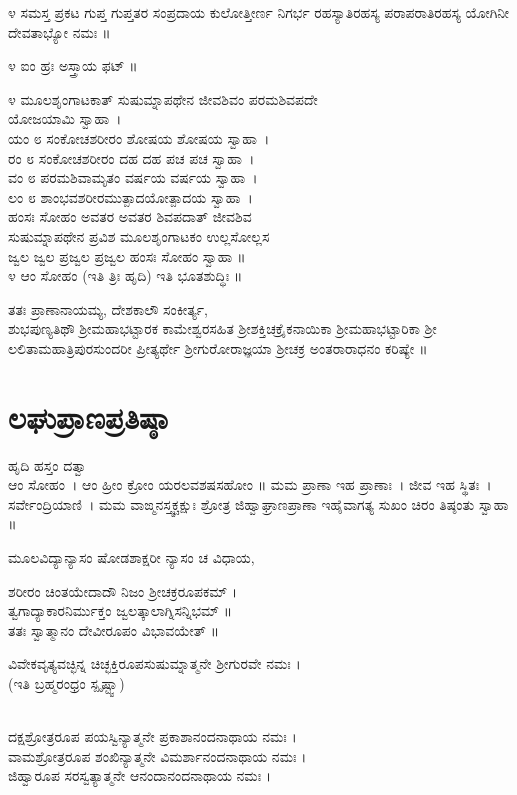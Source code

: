 ೪ ಸಮಸ್ತ ಪ್ರಕಟ ಗುಪ್ತ ಗುಪ್ತತರ ಸಂಪ್ರದಾಯ ಕುಲೋತ್ತೀರ್ಣ ನಿಗರ್ಭ ರಹಸ್ಯಾ\-ತಿರಹಸ್ಯ ಪರಾಪರಾತಿರಹಸ್ಯ ಯೋಗಿನೀ ದೇವತಾಭ್ಯೋ ನಮಃ ॥

೪ ಐಂ ಹ್ರಃ ಅಸ್ತ್ರಾಯ ಫಟ್ ॥

೪ ಮೂಲಶೃಂಗಾಟಕಾತ್ ಸುಷುಮ್ನಾಪಥೇನ ಜೀವಶಿವಂ ಪರಮಶಿವಪದೇ \\ಯೋಜಯಾಮಿ ಸ್ವಾಹಾ~।\\
ಯಂ ೮ ಸಂಕೋಚಶರೀರಂ ಶೋಷಯ ಶೋಷಯ ಸ್ವಾಹಾ~।\\
ರಂ ೮ ಸಂಕೋಚಶರೀರಂ ದಹ ದಹ ಪಚ ಪಚ ಸ್ವಾಹಾ~।\\
ವಂ ೮ ಪರಮಶಿವಾಮೃತಂ ವರ್ಷಯ ವರ್ಷಯ ಸ್ವಾಹಾ~।\\
ಲಂ ೮ ಶಾಂಭವಶರೀರಮುತ್ಪಾದಯೋತ್ಪಾದಯ ಸ್ವಾಹಾ~।\\
ಹಂಸಃ ಸೋಹಂ ಅವತರ ಅವತರ ಶಿವಪದಾತ್ ಜೀವಶಿವ\\ ಸುಷುಮ್ನಾಪಥೇನ ಪ್ರವಿಶ ಮೂಲಶೃಂಗಾಟಕಂ ಉಲ್ಲಸೋಲ್ಲಸ\\ ಜ್ವಲ ಜ್ವಲ ಪ್ರಜ್ವಲ ಪ್ರಜ್ವಲ ಹಂಸಃ ಸೋಹಂ ಸ್ವಾಹಾ ॥\\
೪ ಆಂ ಸೋಹಂ (ಇತಿ ತ್ರಿಃ ಹೃದಿ) ಇತಿ ಭೂತಶುದ್ಧಿಃ ॥

ತತಃ ಪ್ರಾಣಾನಾಯಮ್ಯ, ದೇಶಕಾಲೌ ಸಂಕೀರ್ತ್ಯ,\\
ಶುಭಪುಣ್ಯತಿಥೌ ಶ್ರೀಮಹಾಭಟ್ಟಾರಕ ಕಾಮೇಶ್ವರಸಹಿತ ಶ್ರೀಶಕ್ತಿಚಕ್ರೈಕನಾಯಿಕಾ ಶ್ರೀಮಹಾಭಟ್ಟಾರಿಕಾ ಶ್ರೀ ಲಲಿತಾಮಹಾತ್ರಿಪುರಸುಂದರೀ ಪ್ರೀತ್ಯರ್ಥೇ ಶ್ರೀಗುರೋರಾಜ್ಞಯಾ ಶ್ರೀಚಕ್ರ ಅಂತರಾರಾಧನಂ ಕರಿಷ್ಯೇ ॥


\section{ಲಘುಪ್ರಾಣಪ್ರತಿಷ್ಠಾ}
ಹೃದಿ ಹಸ್ತಂ ದತ್ವಾ\\ಆಂ ಸೋಹಂ~। ಆಂ ಹ್ರೀಂ ಕ್ರೋಂ ಯರಲವಶಷಸಹೋಂ ॥ ಮಮ ಪ್ರಾಣಾ ಇಹ ಪ್ರಾಣಾಃ~। ಜೀವ ಇಹ ಸ್ಥಿತಃ~। ಸರ್ವೇಂದ್ರಿಯಾಣಿ~। ಮಮ ವಾಙ್ಮನಸ್ತ್ವಕ್ಚಕ್ಷುಃ ಶ್ರೋತ್ರ ಜಿಹ್ವಾಘ್ರಾಣಪ್ರಾಣಾ ಇಹೈವಾಗತ್ಯ ಸುಖಂ ಚಿರಂ ತಿಷ್ಠಂತು ಸ್ವಾಹಾ ॥

ಮೂಲವಿದ್ಯಾನ್ಯಾಸಂ ಷೋಡಶಾಕ್ಷರೀ ನ್ಯಾಸಂ ಚ ವಿಧಾಯ,

ಶರೀರಂ ಚಿಂತಯೇದಾದೌ ನಿಜಂ ಶ್ರೀಚಕ್ರರೂಪಕಮ್ ।\\
ತ್ವಗಾದ್ಯಾಕಾರನಿರ್ಮುಕ್ತಂ ಜ್ವಲತ್ಕಾಲಾಗ್ನಿಸನ್ನಿಭಮ್ ॥\\
ತತಃ ಸ್ವಾತ್ಮಾನಂ ದೇವೀರೂಪಂ ವಿಭಾವಯೇತ್ ॥


ವಿವೇಕವೃತ್ಯವಚ್ಛಿನ್ನ ಚಿಚ್ಛಕ್ತಿರೂಪಸುಷುಮ್ನಾತ್ಮನೇ ಶ್ರೀಗುರವೇ ನಮಃ ।\\(ಇತಿ ಬ್ರಹ್ಮರಂಧ್ರಂ ಸ್ಪೃಷ್ಟ್ವಾ)

\\
ದಕ್ಷಶ್ರೋತ್ರರೂಪ ಪಯಸ್ವಿನ್ಯಾತ್ಮನೇ ಪ್ರಕಾಶಾನಂದನಾಥಾಯ ನಮಃ ।\\
ವಾಮಶ್ರೋತ್ರರೂಪ ಶಂಖಿನ್ಯಾತ್ಮನೇ ವಿಮರ್ಶಾನಂದನಾಥಾಯ ನಮಃ ।\\
ಜಿಹ್ವಾರೂಪ ಸರಸ್ವತ್ಯಾತ್ಮನೇ ಆನಂದಾನಂದನಾಥಾಯ ನಮಃ ।

